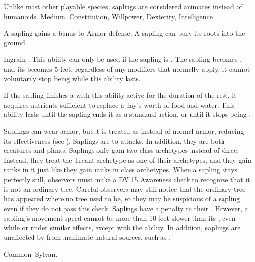    Unlike most other playable species, saplings are considered animates instead of humanoids.
   Medium.
    Constitution,  Willpower,  Dexterity,  Intelligence
  \begin{itemize}
     A sapling gains a  bonus to Armor defense.
     A sapling can bury its roots into the ground.
      \begin{activeability}{Ingrain}
        \abilityusagetime {}.
        \rankline
        This ability can only be used if the sapling is .
        The sapling becomes \braced, and its  becomes 5 feet, regardless of any modifiers that normally apply.
        It cannot voluntarily stop being  while this ability lasts.

        If the sapling finishes a  with this ability active for the duration of the rest, it acquires nutrients sufficient to replace a day's worth of food and water.
        This ability lasts until the sapling ends it as a standard action, or until it stops being .
      \end{activeability}
     Saplings can wear armor, but it is treated as  instead of normal armor, reducing its effectiveness (see ).
     Saplings are \vulnerable to \atFire attacks. In addition, they are both creatures and plants.
     Saplings only gain two class archetypes instead of three.
      Instead, they treat the Treant archetype as one of their archetypes, and they gain ranks in it just like they gain ranks in class archetypes.
     When a sapling stays perfectly still, observers must make a DV 15 Awareness check to recognize that it is not an ordinary tree.
      Careful observers may still notice that the ordinary tree has appeared where no tree used to be, so they may be suspicious of a sapling even if they do not pass this check.
     Saplings have a  penalty to their .
      However, a sapling's movement speed cannot be more than 10 feet slower than its , even while \slowed or under similar effects, except with the  ability.
      In addition, saplings are unaffected by  from inanimate natural sources, such as .
  \end{itemize}
   Common, Sylvan.

